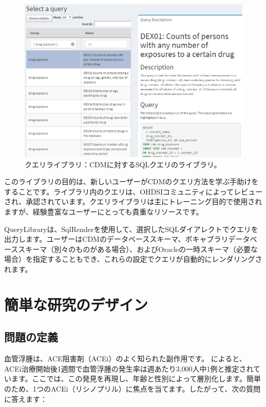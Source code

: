 \documentclass[
  11pt]{book}
\theoremstyle{definition}
\theoremstyle{definition}
\theoremstyle{definition}
\theoremstyle{definition}
\theoremstyle{remark}
\begin{document}
\begin{figure}

{\centering \includegraphics[width=1\linewidth]{images/SqlAndR/queryLibrary} 

}

\caption{クエリライブラリ：CDMに対するSQLクエリのライブラリ。}\label{fig:queryLibrary}
\end{figure}

このライブラリの目的は、新しいユーザーがCDMのクエリ方法を学ぶ手助けをすることです。ライブラリ内のクエリは、OHDSIコミュニティによってレビューされ、承認されています。クエリライブラリは主にトレーニング目的で使用されますが、経験豊富なユーザーにとっても貴重なリソースです。

QueryLibraryは、SqlRenderを使用して、選択したSQLダイアレクトでクエリを出力します。ユーザーはCDMのデータベーススキーマ、ボキャブラリデータベーススキーマ（別々のものがある場合）、およびOracleの一時スキーマ（必要な場合）を指定することもでき、これらの設定でクエリが自動的にレンダリングされます。

\section{簡単な研究のデザイン}\label{ux7c21ux5358ux306aux7814ux7a76ux306eux30c7ux30b6ux30a4ux30f3}

\subsection{問題の定義}\label{ux554fux984cux306eux5b9aux7fa9}

血管浮腫は、ACE阻害剤（ACEi）のよく知られた副作用です。\citet{slater_1988} によると、ACEi治療開始後1週間で血管浮腫の発生率は週あたり3,000人中1例と推定されています。ここでは、この発見を再現し、年齢と性別によって層別化します。簡単のため、1つのACEi（リシノプリル）に焦点を当てます。したがって、次の質問に答えます：
\end{document}
